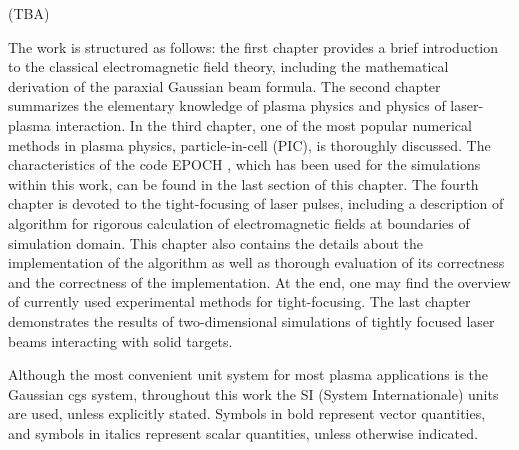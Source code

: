 (TBA)

The work is structured as follows: the first chapter provides a brief introduction to the classical electromagnetic field theory, including the mathematical derivation of the paraxial Gaussian beam formula. The second chapter summarizes the elementary knowledge of plasma physics and physics of laser-plasma interaction. In the third chapter, one of the most popular numerical methods in plasma physics, particle-in-cell (PIC), is thoroughly discussed. The characteristics of the code EPOCH \cite{bennett}, which has been used for the simulations within this work, can be found in the last section of this chapter. The fourth chapter is devoted to the tight-focusing of laser pulses, including a description of algorithm for rigorous calculation of electromagnetic fields at boundaries of simulation domain. This chapter also contains the details about the implementation of the algorithm as well as thorough evaluation of its correctness and the correctness of the implementation. At the end, one may find the overview of currently used experimental methods for tight-focusing. The last chapter demonstrates the results of two-dimensional simulations of tightly focused laser beams interacting with solid targets.

Although the most convenient unit system for most plasma applications is the Gaussian cgs system, throughout this work the SI (System Internationale) units are used, unless explicitly stated. Symbols in bold represent vector quantities, and symbols in italics represent scalar quantities, unless otherwise indicated.
